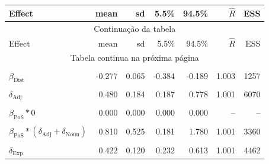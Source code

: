 \begin{longtable}{lrrrrrr}
\toprule
Effect & mean & sd & 5.5\% & 94.5\% & $\widehat{R}$ & ESS\\
\midrule
\endfirsthead%

\multicolumn{7}{c}{Continuação da tabela}\\
\midrule
Effect & mean & sd & 5.5\% & 94.5\% & $\widehat{R}$ & ESS\\
\midrule
\endhead%

\midrule
\multicolumn{7}{c}{Tabela continua na próxima página}\\
\bottomrule
\endfoot%


\bottomrule
\endlastfoot%

\cellcolor{gray!10}{$\beta_{\text{Copula}}$} & \cellcolor{gray!10}{1.653} & \cellcolor{gray!10}{0.449} & \cellcolor{gray!10}{0.943} & \cellcolor{gray!10}{2.388} & \cellcolor{gray!10}{1.001} & \cellcolor{gray!10}{3168}\\
$\beta_{\text{Dist}}$ & -0.277 & 0.065 & -0.384 & -0.189 & 1.003 & 1257\\
\cellcolor{gray!10}{$\beta_{\text{Pos}}$} & \cellcolor{gray!10}{0.810} & \cellcolor{gray!10}{0.525} & \cellcolor{gray!10}{0.181} & \cellcolor{gray!10}{1.780} & \cellcolor{gray!10}{1.001} & \cellcolor{gray!10}{3360}\\
$\delta_{\text{Adj}}$ & 0.480 & 0.184 & 0.187 & 0.778 & 1.001 & 6070\\
\cellcolor{gray!10}{$\delta_{\text{Noun}}$} & \cellcolor{gray!10}{0.520} & \cellcolor{gray!10}{0.184} & \cellcolor{gray!10}{0.222} & \cellcolor{gray!10}{0.813} & \cellcolor{gray!10}{1.001} & \cellcolor{gray!10}{6070}\\
$\beta_{\text{PoS}} * 0$ & 0.000 & 0.000 & 0.000 & 0.000 & -- & --\\
\cellcolor{gray!10}{$\beta_{\text{PoS}} * \delta_{\text{Adj}}$} & \cellcolor{gray!10}{0.377} & \cellcolor{gray!10}{0.279} & \cellcolor{gray!10}{0.064} & \cellcolor{gray!10}{0.882} & \cellcolor{gray!10}{1.001} & \cellcolor{gray!10}{3417}\\
$\beta_{\text{PoS}} * (\delta_{\text{Adj}} + \delta_{\text{Noun}})$ & 0.810 & 0.525 & 0.181 & 1.780 & 1.001 & 3360\\
\cellcolor{gray!10}{$\beta_{\text{Theta}}$} & \cellcolor{gray!10}{2.705} & \cellcolor{gray!10}{0.616} & \cellcolor{gray!10}{1.846} & \cellcolor{gray!10}{3.787} & \cellcolor{gray!10}{1.003} & \cellcolor{gray!10}{1272}\\
$\delta_{\text{Exp}}$ & 0.422 & 0.120 & 0.232 & 0.613 & 1.001 & 4462\\

\end{longtable}
